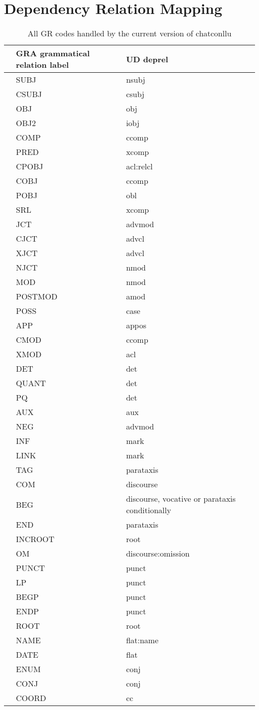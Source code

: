 \newpage
\vspace{-0.5cm}
\section{Dependency Relation Mapping}
\begin{table}[h!]
\caption {All GR codes handled by the current version of chatconllu} \label{tab:grmap}
\centering
\begin{tabularx}{\widefigurewidth}{@{}llX@{}}
\toprule
	& \textbf{GRA grammatical relation label}& \textbf{UD deprel}\\ \midrule
	& SUBJ& nsubj\\
	& CSUBJ& csubj\\
	& OBJ& obj\\
	& OBJ2& iobj\\
	& COMP& ccomp\\
	& PRED& xcomp\\
	& CPOBJ& acl:relcl\\
	& COBJ& ccomp\\
	& POBJ& obl\\
	& SRL& xcomp\\
	& JCT& advmod\\
	& CJCT& advcl\\
	& XJCT& advcl\\
	& NJCT& nmod\\
	& MOD& nmod\\
	& POSTMOD& amod\\
	& POSS& case\\
	& APP& appos\\
	& CMOD& ccomp\\
	& XMOD& acl\\
	& DET& det\\
	& QUANT& det\\
	& PQ& det\\
	& AUX& aux\\
	& NEG & advmod\\
	& INF& mark\\
	& LINK& mark\\
	& TAG& parataxis\\
	& COM& discourse\\
	& BEG& discourse, vocative or parataxis conditionally\\
	& END& parataxis\\
	& INCROOT& root \\
	& OM& discourse:omission\\
	& PUNCT& punct\\
	& LP& punct\\
	& BEGP& punct\\
	& ENDP& punct\\
	& ROOT& root\\
	& NAME& flat:name\\
	& DATE& flat\\
	& ENUM& conj\\
	& CONJ& conj\\
	& COORD& cc\\\bottomrule
\end{tabularx}
\end{table}

